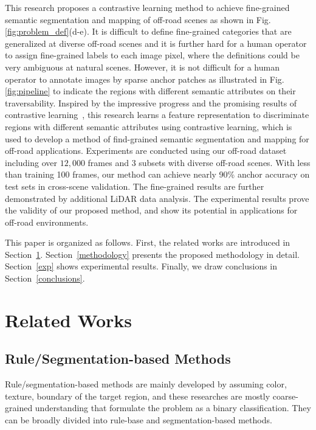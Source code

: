 \documentclass[letterpaper, 10 pt, conference]{ieeeconf}  %
\begin{document}
This research proposes a contrastive learning method to achieve fine-grained semantic segmentation and mapping of off-road scenes as shown in Fig. \ref{fig:problem_def}(d-e).
It is difficult to define fine-grained categories that are generalized at diverse off-road scenes and it is further hard for a human operator to assign fine-grained labels to each image pixel, where the definitions could be very ambiguous at natural scenes. However, it is not difficult for a human operator to annotate images by sparse anchor patches as illustrated in Fig. \ref{fig:pipeline} to indicate the regions with different semantic attributes on their traversability. Inspired by the impressive progress and the promising results of contrastive learning~\cite{oord2018CPC}\cite{chen2020simple}\cite{he2020momentum}, this research learns a feature representation to discriminate regions with different semantic attributes using contrastive learning, which is used to develop a method of find-grained semantic segmentation and mapping for off-road applications.
Experiments are conducted using our off-road dataset including over $12,000$ frames and 3 subsets with diverse off-road scenes. With less than training 100 frames, our method can achieve nearly 90\% anchor accuracy on test sets in cross-scene validation. The fine-grained results are further demonstrated by additional LiDAR data analysis.
The experimental results prove the validity of our proposed method, and show its potential in applications for off-road environments.

This paper is organized as follows. First, the related works
are introduced in Section~\ref{related_works}. Section~\ref{methodology} presents the proposed methodology in detail. Section~\ref{exp} shows experimental results. Finally, we draw conclusions in Section~\ref{conclusions}.

\section{Related Works} \label{related_works}
\subsection{Rule/Segmentation-based Methods}
Rule/segmentation-based methods are mainly developed by assuming color, texture, boundary of the target region, and these researches are mostly coarse-grained understanding that formulate the problem as a binary classification. They can be broadly divided into rule-base and segmentation-based methods.
\end{document}
